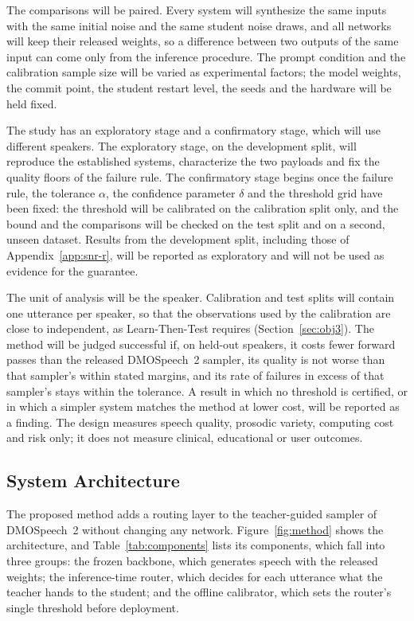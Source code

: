 The comparisons will be paired. Every system will synthesize the same inputs with the same initial noise and the same student noise draws, and all networks will keep their released weights, so a difference between two outputs of the same input can come only from the inference procedure. The prompt condition and the calibration sample size will be varied as experimental factors; the model weights, the commit point, the student restart level, the seeds and the hardware will be held fixed.

The study has an exploratory stage and a confirmatory stage, which will use different speakers. The exploratory stage, on the development split, will reproduce the established systems, characterize the two payloads and fix the quality floors of the failure rule. The confirmatory stage begins once the failure rule, the tolerance $\alpha$, the confidence parameter $\delta$ and the threshold grid have been fixed: the threshold will be calibrated on the calibration split only, and the bound and the comparisons will be checked on the test split and on a second, unseen dataset. Results from the development split, including those of Appendix~\ref{app:snr-r}, will be reported as exploratory and will not be used as evidence for the guarantee.

The unit of analysis will be the speaker. Calibration and test splits will contain one utterance per speaker, so that the observations used by the calibration are close to independent, as Learn-Then-Test requires (Section~\ref{sec:obj3}). The method will be judged successful if, on held-out speakers, it costs fewer forward passes than the released DMOSpeech~2 sampler, its quality is not worse than that sampler's within stated margins, and its rate of failures in excess of that sampler's stays within the tolerance. A result in which no threshold is certified, or in which a simpler system matches the method at lower cost, will be reported as a finding. The design measures speech quality, prosodic variety, computing cost and risk only; it does not measure clinical, educational or user outcomes.

\subsection{System Architecture}
\label{sec:architecture}

The proposed method adds a routing layer to the teacher-guided sampler of DMOSpeech~2 without changing any network. Figure~\ref{fig:method} shows the architecture, and Table~\ref{tab:components} lists its components, which fall into three groups: the frozen backbone, which generates speech with the released weights; the inference-time router, which decides for each utterance what the teacher hands to the student; and the offline calibrator, which sets the router's single threshold before deployment.

